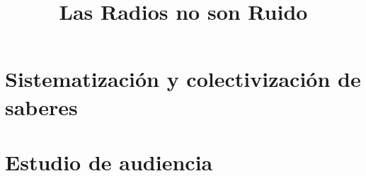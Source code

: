 \documentclass[10pt,final,a5paper]{book}
\title{Las Radios no son Ruido}
\begin{document}
\frontmatter


% 
% 
% 
%
\mainmatter

\tableofcontents


\newpage




\part{Sistematización y colectivización de saberes}







\part{Estudio de audiencia}


% 

% 

% 
\end{document}

